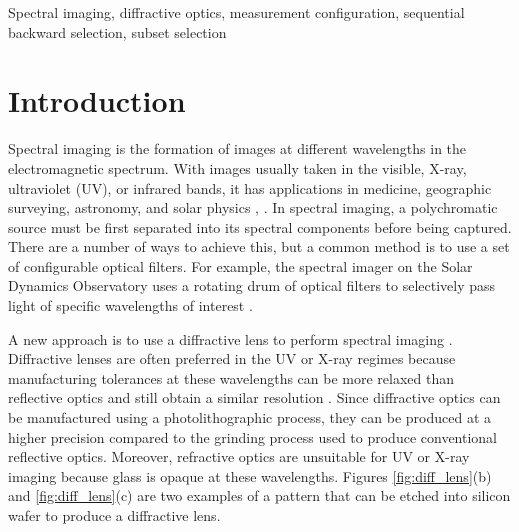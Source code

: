 \documentclass{article}
\begin{document}
\begin{keywords}
Spectral imaging, diffractive optics, measurement configuration, sequential
backward selection, subset selection
\end{keywords}

\section{Introduction}
\label{sec:intro}
Spectral imaging is the formation of images at different wavelengths in the
electromagnetic spectrum. With images usually taken in the visible, X-ray,
ultraviolet (UV), or infrared bands, it has applications in medicine,
geographic surveying, astronomy, and solar physics \cite{shaw2003spectral},
\cite{garini2006spectral}. In spectral imaging, a polychromatic source must be first separated
into its spectral components before being captured. There are a number of ways
to achieve this, but a common method is to use a set of configurable optical
filters. For example, the spectral imager on the Solar Dynamics Observatory uses
a rotating drum of optical filters to selectively pass light of specific
wavelengths of interest \cite{sdo}.



A new approach is to use a diffractive lens to perform spectral imaging
\cite{oktem2014icip}.
Diffractive lenses are often preferred in the UV or X-ray regimes because
manufacturing tolerances at these wavelengths can be more relaxed than
reflective optics and still obtain a similar resolution \cite{davila2011high}.
Since diffractive optics can be manufactured using a photolithographic process,
they can be produced at a higher precision compared to the grinding process used
to produce conventional reflective optics. Moreover, refractive optics are
unsuitable for UV or X-ray imaging because glass is opaque at these wavelengths.
Figures \ref{fig:diff_lens}(b) and \ref{fig:diff_lens}(c) are two examples of a
pattern that can be etched into silicon wafer to produce a diffractive lens.
\end{document}
